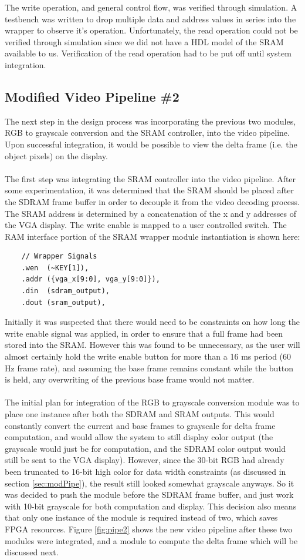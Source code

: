 \documentclass[11pt]{article} %
\begin{document}
The write operation, and general control flow, was verified through simulation. A testbench was written to drop multiple data and address values in series into the wrapper to observe it's operation. Unfortunately, the read operation could not be verified through simulation since we did not have a HDL model of the SRAM available to us. Verification of the read operation had to be put off until system integration.
\subsection{Modified Video Pipeline \#2}
The next step in the design process was incorporating the previous two modules, RGB to grayscale conversion and the SRAM controller, into the video pipeline. Upon successful integration, it would be possible to view the delta frame (i.e. the object pixels) on the display. \\\\
The first step was integrating the SRAM controller into the video pipeline. After some experimentation, it was determined that the SRAM should be placed after the SDRAM frame buffer in order to decouple it from the video decoding process. The SRAM address is determined by a concatenation of the x and y addresses of the VGA display. The write enable is mapped to a user controlled switch. The RAM interface portion of the SRAM wrapper module instantiation is shown here:
\begin{verbatim}
	// Wrapper Signals
	.wen  (~KEY[1]),
	.addr ({vga_x[9:0], vga_y[9:0]}),
	.din  (sdram_output),
	.dout (sram_output),
\end{verbatim}
Initially it was suspected that there would need to be constraints on how long the write enable signal was applied, in order to ensure that a full frame had been stored into the SRAM. However this was found to be unnecessary, as the user will almost certainly hold the write enable button for more than a 16 ms period (60 Hz frame rate), and assuming the base frame remains constant while the button is held, any overwriting of the previous base frame would not matter. \\\\
The initial plan for integration of the RGB to grayscale conversion module was to place one instance after both the SDRAM and SRAM outputs. This would constantly convert the current and base frames to grayscale for delta frame computation, and would allow the system to still display color output (the grayscale would just be for computation, and the SDRAM color output would still be sent to the VGA display). However, since the 30-bit RGB had already been truncated to 16-bit high color for data width constraints (as discussed in section \ref{sec:modPipe}), the result still looked somewhat grayscale anyways. So it was decided to push the module before the SDRAM frame buffer, and just work with 10-bit grayscale for both computation and display. This decision also means that only one instance of the module is required instead of two, which saves FPGA resources. Figure \ref{fig:pipe2} shows the new video pipeline after these two modules were integrated, and a module to compute the delta frame which will be discussed next.
\end{document}
